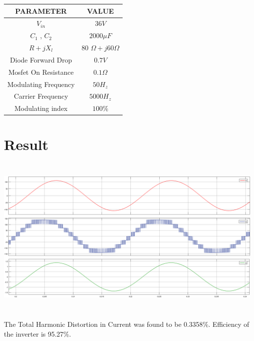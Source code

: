 \documentclass[12pt,a4paper]{report}
\begin{document}
\begin{center}
	\begin{tabular}{|c|c|} 
		\hline
		{\bf PARAMETER} & {\bf VALUE} \\  
		\hline
		$V_{in}$ & $36V$ \\ 
		\hline
		$C_1$ , $C_2$ & $2000{\mu}F $\\
		\hline
		$R + jX_l$ & 80 ${\Omega} + j60{\Omega}$ \\
		\hline
		Diode Forward Drop & $0.7V$ \\
		\hline
		Mosfet On Resistance & $0.1{\Omega}$ \\
		\hline
		Modulating Frequency & $50H_z$ \\
		\hline
		Carrier Frequency & $5000H_z$ \\
		\hline
		Modulating index & $100\%$ \\
		\hline
		
		
	\end{tabular}
\end{center}

\section*{Result}

\begin{center}
	\includegraphics[width=16cm,height=8cm]{figures/SIMULINK_OUTPUT}
\end{center}

The Total Harmonic Distortion in Current was found to be 0.3358\%. Efficiency of the inverter is 95.27\%.
\end{document}

